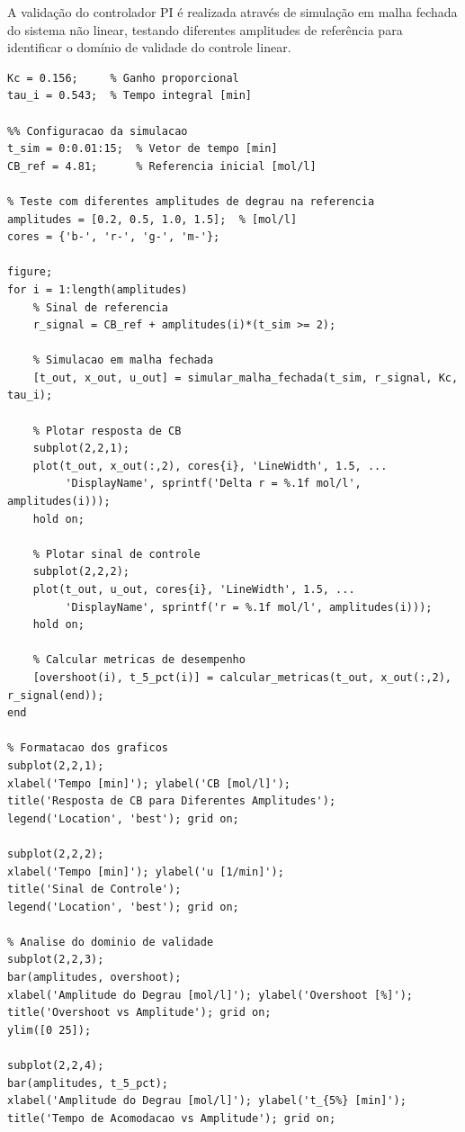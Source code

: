 \documentclass[a4paper,12pt]{article}
\begin{document}
A validação do controlador PI é realizada através de simulação em malha fechada do sistema não linear, testando diferentes amplitudes de referência para identificar o domínio de validade do controle linear.

\begin{lstlisting}[caption=Simulacao do controle PI em sistema nao linear]
%% Parametros do controlador PI projetado
Kc = 0.156;     % Ganho proporcional
tau_i = 0.543;  % Tempo integral [min]

%% Configuracao da simulacao
t_sim = 0:0.01:15;  % Vetor de tempo [min]
CB_ref = 4.81;      % Referencia inicial [mol/l]

% Teste com diferentes amplitudes de degrau na referencia
amplitudes = [0.2, 0.5, 1.0, 1.5];  % [mol/l]
cores = {'b-', 'r-', 'g-', 'm-'};

figure;
for i = 1:length(amplitudes)
    % Sinal de referencia
    r_signal = CB_ref + amplitudes(i)*(t_sim >= 2);
    
    % Simulacao em malha fechada
    [t_out, x_out, u_out] = simular_malha_fechada(t_sim, r_signal, Kc, tau_i);
    
    % Plotar resposta de CB
    subplot(2,2,1);
    plot(t_out, x_out(:,2), cores{i}, 'LineWidth', 1.5, ...
         'DisplayName', sprintf('Delta r = %.1f mol/l', amplitudes(i)));
    hold on;
    
    % Plotar sinal de controle
    subplot(2,2,2);
    plot(t_out, u_out, cores{i}, 'LineWidth', 1.5, ...
         'DisplayName', sprintf('r = %.1f mol/l', amplitudes(i)));
    hold on;
    
    % Calcular metricas de desempenho
    [overshoot(i), t_5_pct(i)] = calcular_metricas(t_out, x_out(:,2), r_signal(end));
end

% Formatacao dos graficos
subplot(2,2,1);
xlabel('Tempo [min]'); ylabel('CB [mol/l]');
title('Resposta de CB para Diferentes Amplitudes');
legend('Location', 'best'); grid on;

subplot(2,2,2);
xlabel('Tempo [min]'); ylabel('u [1/min]');
title('Sinal de Controle'); 
legend('Location', 'best'); grid on;

% Analise do dominio de validade
subplot(2,2,3);
bar(amplitudes, overshoot);
xlabel('Amplitude do Degrau [mol/l]'); ylabel('Overshoot [%]');
title('Overshoot vs Amplitude'); grid on;
ylim([0 25]);

subplot(2,2,4);
bar(amplitudes, t_5_pct);
xlabel('Amplitude do Degrau [mol/l]'); ylabel('t_{5%} [min]');
title('Tempo de Acomodacao vs Amplitude'); grid on;


\end{lstlisting}
\end{document}
